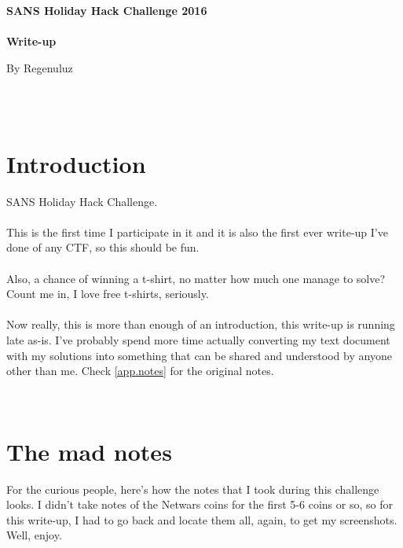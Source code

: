 \documentclass[12pt,a4paper]{article}
\begin{document}
\begin{titlepage}
	\begin{center}
		\vspace*{13\baselineskip}
		\huge
		\bfseries
		SANS Holiday Hack Challenge 2016\\ 
		\ \\
		Write-up \\[5\baselineskip]

		\small
		\vfill
	\end{center}	
	\begin{flushleft}
		By Regenuluz\\
		\ \\
	\end{flushleft}
\end{titlepage}

\ \\
\section*{Introduction}
\label{section.intro}
	SANS Holiday Hack Challenge.\\
	\\
	This is the first time I participate in it and it is also the first ever write-up I've done of any CTF, so this should be fun.\\
	\\
	Also, a chance of winning a t-shirt, no matter how much one manage to solve? Count me in, I love free t-shirts, seriously.\\
	\\
	Now really, this is more than enough of an introduction, this write-up is running late as-is. I've probably spend more time actually converting my text document with my solutions into something that can be shared and understood by anyone other than me. Check \autoref{app.notes} for the original notes.

\thispagestyle{empty} 
\newpage

\thispagestyle{empty} 
\tableofcontents
\thispagestyle{empty} 
\newpage

\setcounter{page}{1}

\ \\
	







\newpage

\newpage
\appendix
\section{The mad notes} \label{app.notes}
	For the curious people, here's how the notes that I took during this challenge looks. I didn't take notes of the Netwars coins for the first 5-6 coins or so, so for this write-up, I had to go back and locate them all, again, to get my screenshots. Well, enjoy.
	
	
\end{document}
